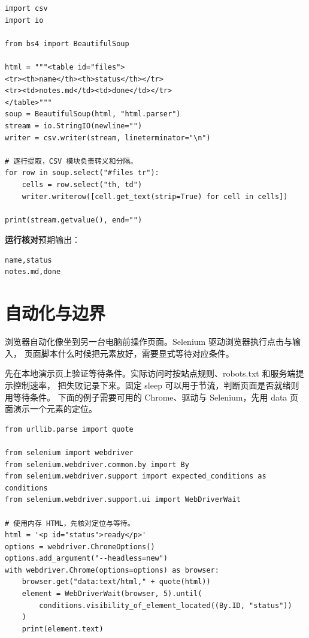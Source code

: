 \documentclass[UTF8,a4paper,oneside,openany,fontset=none,11pt]{ctexbook}
\newcommand{\code}[1]{\texttt{\detokenize{#1}}}
\begin{document}
\begin{lstlisting}[title={\code{extract_table.py}}]
import csv
import io

from bs4 import BeautifulSoup

html = """<table id="files">
<tr><th>name</th><th>status</th></tr>
<tr><td>notes.md</td><td>done</td></tr>
</table>"""
soup = BeautifulSoup(html, "html.parser")
stream = io.StringIO(newline="")
writer = csv.writer(stream, lineterminator="\n")

# 逐行提取，CSV 模块负责转义和分隔。
for row in soup.select("#files tr"):
    cells = row.select("th, td")
    writer.writerow([cell.get_text(strip=True) for cell in cells])

print(stream.getvalue(), end="")
\end{lstlisting}


\textbf{运行核对}\enspace 预期输出：
\begin{lstlisting}[language={},numbers=none]
name,status
notes.md,done
\end{lstlisting}

\par


\section{自动化与边界}

浏览器自动化像坐到另一台电脑前操作页面。Selenium 驱动浏览器执行点击与输入，
页面脚本什么时候把元素放好，需要显式等待对应条件。

先在本地演示页上验证等待条件。实际访问时按站点规则、robots.txt 和服务端提示控制速率，
把失败记录下来。固定 sleep 可以用于节流，判断页面是否就绪则用等待条件。
下面的例子需要可用的 Chrome、驱动与 Selenium，先用 data 页面演示一个元素的定位。


\begin{lstlisting}[title={\code{browser_demo.py}}]
from urllib.parse import quote

from selenium import webdriver
from selenium.webdriver.common.by import By
from selenium.webdriver.support import expected_conditions as conditions
from selenium.webdriver.support.ui import WebDriverWait

# 使用内存 HTML，先核对定位与等待。
html = '<p id="status">ready</p>'
options = webdriver.ChromeOptions()
options.add_argument("--headless=new")
with webdriver.Chrome(options=options) as browser:
    browser.get("data:text/html," + quote(html))
    element = WebDriverWait(browser, 5).until(
        conditions.visibility_of_element_located((By.ID, "status"))
    )
    print(element.text)
\end{lstlisting}
\end{document}
